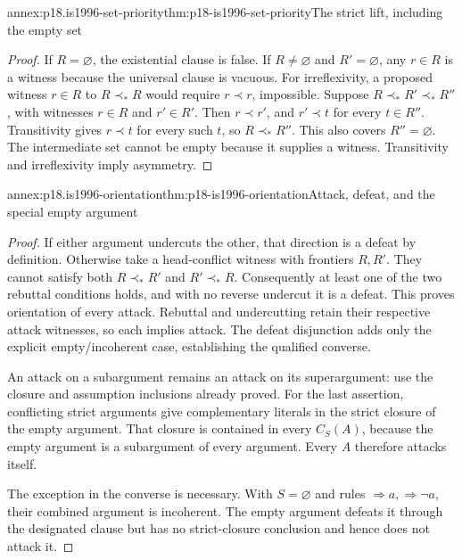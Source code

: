 \begin{annexitem}{annex:p18.is1996-set-priority}{thm:p18-is1996-set-priority}{The strict lift, including the empty set}
\begin{proof}
If \(R=\varnothing\), the existential clause is false.
If \(R\ne\varnothing\) and \(R'=\varnothing\), any \(r\in R\)
is a witness because the universal clause is vacuous.
For irreflexivity, a proposed witness \(r\in R\) to \(R\prec_*R\)
would require \(r\prec r\), impossible.
Suppose \(R\prec_*R'\prec_*R''\), with witnesses
\(r\in R\) and \(r'\in R'\).
Then \(r\prec r'\), and \(r'\prec t\) for every \(t\in R''\).
Transitivity gives \(r\prec t\) for every such \(t\), so
\(R\prec_*R''\). This also covers \(R''=\varnothing\).
The intermediate set cannot be empty because it supplies a witness.
Transitivity and irreflexivity imply asymmetry.
\end{proof}
\end{annexitem}

\begin{annexitem}{annex:p18.is1996-orientation}{thm:p18-is1996-orientation}{Attack, defeat, and the special empty argument}
\begin{proof}
If either argument undercuts the other, that direction is a defeat
by definition. Otherwise take a head-conflict witness with frontiers
\(R,R'\). They cannot satisfy both \(R\prec_*R'\) and
\(R'\prec_*R\). Consequently at least one of the two rebuttal
conditions holds, and with no reverse undercut it is a defeat.
This proves orientation of every attack.
Rebuttal and undercutting retain their respective attack witnesses,
so each implies attack. The defeat disjunction adds only the
explicit empty/incoherent case, establishing the qualified converse.

An attack on a subargument remains an attack on its superargument:
use the closure and assumption inclusions already proved.
For the last assertion, conflicting strict arguments give
complementary literals in the strict closure of the empty argument.
That closure is contained in every \(C_S(A)\), because the
empty argument is a subargument of every argument.
Every \(A\) therefore attacks itself.

The exception in the converse is necessary. With \(S=\varnothing\)
and rules \(\Rightarrow a,\Rightarrow\neg a\), their combined
argument is incoherent. The empty argument defeats it through
the designated clause but has no strict-closure conclusion
and hence does not attack it.
\end{proof}
\end{annexitem}

